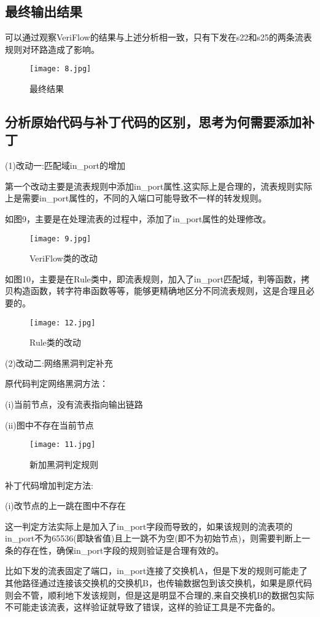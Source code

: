 \documentclass{xjtureport}
\begin{document}
\subsection{最终输出结果}
可以通过观察VeriFlow的结果与上述分析相一致，只有下发在s22和s25的两条流表规则对环路造成了影响。
\begin{figure}[H]
	\centering
	\texttt{[image: 8.jpg]}
	\caption{最终结果}
\end{figure}
\subsection{分析原始代码与补丁代码的区别，思考为何需要添加补丁}
(1)改动一:匹配域in\_port的增加\par 
第一个改动主要是流表规则中添加in\_port属性,这实际上是合理的，流表规则实际上是需要in\_port属性的，不同的入端口可能导致不一样的转发规则。\par
如图9，主要是在处理流表的过程中，添加了in\_port属性的处理修改。
\begin{figure}[H]
	\centering
	\texttt{[image: 9.jpg]}
	\caption{VeriFlow类的改动}
\end{figure}
如图10，主要是在Rule类中，即流表规则，加入了in\_port匹配域，判等函数，拷贝构造函数，转字符串函数等等，能够更精确地区分不同流表规则，这是合理且必要的。
\begin{figure}[H]
	\centering
	\texttt{[image: 12.jpg]}
	\caption{Rule类的改动}
\end{figure}
(2)改动二:网络黑洞判定补充\par 
原代码判定网络黑洞方法：\par
(i)当前节点，没有流表指向输出链路\par 
(ii)图中不存在当前节点\par   
\begin{figure}[H]
	\centering
	\texttt{[image: 11.jpg]}
	\caption{新加黑洞判定规则}
\end{figure}
补丁代码增加判定方法:\par
(i)改节点的上一跳在图中不存在\par
这一判定方法实际上是加入了in\_port字段而导致的，如果该规则的流表项的in\_port不为65536(即缺省值)且上一跳不为空(即不为初始节点)，则需要判断上一条的存在性，确保in\_port字段的规则验证是合理有效的。 \par
比如下发的流表固定了端口，in\_port连接了交换机A，但是下发的规则可能走了其他路径通过连接该交换机的交换机B，也传输数据包到该交换机，如果是原代码则会不管，顺利地下发该规则，但是这是明显不合理的,来自交换机B的数据包实际不可能走该流表，这样验证就导致了错误，这样的验证工具是不完备的。\par
\end{document}
